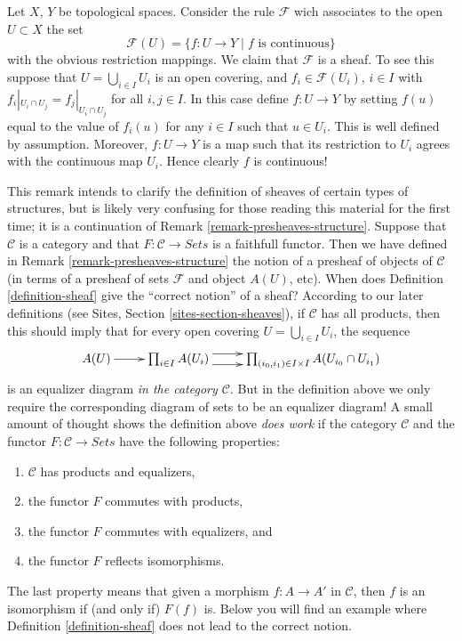\begin{example}
\label{example-basic-continuous-maps}
Let $X$, $Y$ be topological spaces.
Consider the rule $\mathcal{F}$ wich associates to
the open $U \subset X$ the set
$$
\mathcal{F}(U) = \{ f : U \to Y \mid f \text{ is continuous}\}
$$
with the obvious restriction mappings. We claim that
$\mathcal{F}$ is a sheaf. To see this suppose that
$U = \bigcup_{i\in I} U_i$ is an open covering, and
$f_i \in \mathcal{F}(U_i)$, $i\in I$ with
$f_i |_{U_i \cap U_j} = f_j|_{U_i \cap U_j}$ for all $i,j \in I$.
In this case define $f : U \to Y$ by setting $f(u)$
equal to the value of $f_i(u)$ for any $i \in I$ such that
$u \in U_i$. This is well defined by assumption. Moreover,
$f : U \to Y$ is a map such that its restriction to $U_i$
agrees with the continuous map $U_i$. Hence clearly $f$ is
continuous!
\end{example}

\begin{remark}
\label{remark-sheaves-structure}
This remark intends to clarify the definition
of sheaves of certain types of structures,
but is likely very confusing for those reading
this material for the first time; it is a continuation
of Remark \ref{remark-presheaves-structure}.
Suppose that $\mathcal{C}$ is a category and
that $F : \mathcal{C} \to \textit{Sets}$ is
a faithfull functor. Then we have defined
in Remark \ref{remark-presheaves-structure}
the notion of a presheaf of objects of $\mathcal{C}$
(in terms of a presheaf of sets $\mathcal{F}$ and
object $A(U)$, etc).
When does Definition \ref{definition-sheaf} give
the ``correct notion'' of a sheaf? According to
our later definitions (see Sites, Section \ref{sites-section-sheaves}),
if $\mathcal{C}$ has all products, then this should imply that
for every open covering $U = \bigcup_{i \in I} U_i$, the
sequence
$$
\xymatrix{
A(U) \ar[r]
&
\prod\nolimits_{i\in I}
A(U_i)
\ar@<1ex>[r] \ar@<-1ex>[r]
&
\prod\nolimits_{(i_0, i_1) \in I\times I}
A(U_{i_0} \cap U_{i_1})
}
$$
is an equalizer diagram {\it in the category $\mathcal{C}$}.
But in the definition above we only require the
corresponding diagram of sets to be an equalizer diagram!
A small amount of thought shows the definition above {\it does work} if
the category $\mathcal{C}$ and
the functor $F : \mathcal{C} \to \textit{Sets}$
have the following properties:
\begin{enumerate}
\item $\mathcal{C}$ has products and equalizers,
\item the functor $F$ commutes with products,
\item the functor $F$ commutes with equalizers, and
\item the functor $F$ reflects isomorphisms.
\end{enumerate}
The last property means that given a morphism
$f : A \to A'$ in $\mathcal{C}$, then $f$ is
an isomorphism if (and only if) $F(f)$ is.
Below you will find an example where Definition \ref{definition-sheaf}
does not lead to the correct notion.
\end{remark}

